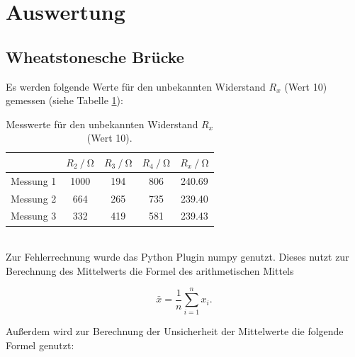 \section{Auswertung}
\subsection{Wheatstonesche Brücke}
Es werden folgende Werte für den unbekannten Widerstand $R_x$ (Wert 10) gemessen (siehe Tabelle \ref{tab:r_10}):
\begin{table}
  \centering
  \begin{tabular}{c|cccc}
    \toprule
    & {$R_2 \:/\: \si{\ohm}$} & {$R_3\:/\: \si{\ohm}$} & {$R_4\:/\: \si{\ohm}$} & {$R_x\:/\: \si{\ohm}$} \\
    \midrule
    {Messung 1} & 1000 & 194 & 806 & 240.69 \\
    {Messung 2} & 664 & 265 & 735 & 239.40 \\
    {Messung 3} & 332 & 419 & 581 & 239.43 \\
    \bottomrule
  \end{tabular}
  \caption{Messwerte für den unbekannten Widerstand $R_x$ (Wert 10).}
  \label{tab:r_10}
\end{table}
\\
Zur Fehlerrechnung wurde das Python Plugin numpy \cite{numpy} genutzt.
Dieses nutzt zur Berechnung des Mittelwerts die Formel des arithmetischen Mittels

\begin{equation}
    \bar{x} = \frac{1}{n} \sum_{i=1}^n x_i.
    \label{eqn:mittel}
\end{equation}

Außerdem wird zur Berechnung der Unsicherheit der Mittelwerte die folgende Formel genutzt:

